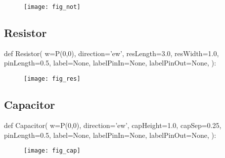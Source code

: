 \begin{figure}[!h]
\centerline{\texttt{[image: fig\_not]}}
\end{figure}

\subsection{Resistor}
\label{func:electronicsResistor}
\begin{python}
def Resistor(
        w=P(0,0),
        direction='ew',
        resLength=3.0,
        resWidth=1.0,
        pinLength=0.5,
        label=None,
        labelPinIn=None,
        labelPinOut=None,
        ):
\end{python}

\begin{figure}[!h]
\centerline{\texttt{[image: fig\_res]}}
\end{figure}

\subsection{Capacitor}
\label{func:electronicsCapacitor}
\begin{python}
def Capacitor(
        w=P(0,0),
        direction='ew',
        capHeight=1.0,
        capSep=0.25,
        pinLength=0.5,
        label=None,
        labelPinIn=None,
        labelPinOut=None,
        ):
\end{python}

\begin{figure}[!h]
\centerline{\texttt{[image: fig\_cap]}}
\end{figure}

